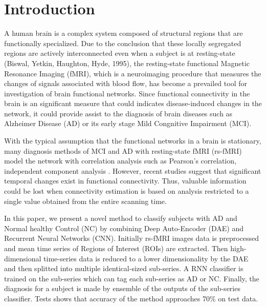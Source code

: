 \section{Introduction}

A human brain is a complex system composed of structural regions that are functionally specialized. Due to the conclusion that these locally segregated regions are actively interconnected even when a subject is at resting-state (Biswal, Yetkin, Haughton, Hyde, 1995), the resting-state functional Magnetic Resonance Imaging (fMRI), which is a neuroimaging procedure that measures the changes of signals associated with blood flow, has become a prevailed tool for investigation of brain functional networks. Since functional connectivity in the brain is an significant measure that could indicates disease-induced changes in the network, it could provide assist to the diagnosis of brain diseases such as Alzheimer Disease (AD) or its early stage Mild Congnitive Impairment (MCI).

With the typical assumption that the functional networks in a brain is stationary, many diagnosis methods of MCI and AD with resting-state fMRI (rs-fMRI) model the network with correlation analysis such as Pearson’s correlation, independent component analysis \cite{li}. However, recent studies \cite{hutch} suggest that significant temporal changes exist in functional connectivity. Thus, valuable information could be lost when connectivity estimation is based on analysis restricted to a single value obtained from the entire scanning time.

In this paper, we present a novel method to classify subjects with AD and Normal healthy Control (NC) by combining Deep Auto-Encoder (DAE) and Recurrent Neural Networks (CNN). Initially rs-fMRI images data is preprocessed and mean time series of Regions of Interest (ROIs) are extracted. Then high-dimensional time-series data  is reduced to a lower dimensionality by the DAE and then splitted into multiple identical-sized sub-series. A RNN classifier is trained on the sub-series which can tag each sub-series as AD or NC. Finally, the diagnosis for a subject is made by ensemble of the outputs of the sub-series classifier. Tests shows that accuracy of the method approaches 70\% on test data.


